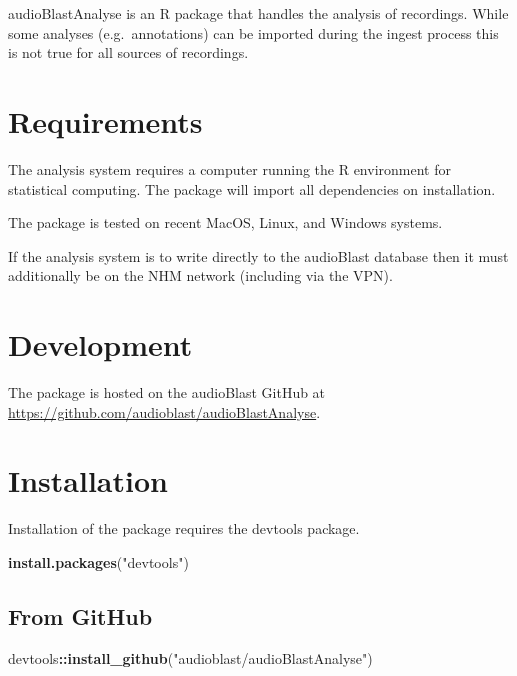 \documentclass[
]{book}
\newenvironment{Shaded}{\begin{snugshade}}{\end{snugshade}}
\newcommand{\FunctionTok}[1]{\textcolor[rgb]{0.13,0.29,0.53}{\textbf{#1}}}
\newcommand{\NormalTok}[1]{#1}
\newcommand{\SpecialCharTok}[1]{\textcolor[rgb]{0.81,0.36,0.00}{\textbf{#1}}}
\newcommand{\StringTok}[1]{\textcolor[rgb]{0.31,0.60,0.02}{#1}}
\begin{document}
audioBlastAnalyse is an R package that handles the analysis of recordings. While some analyses (e.g.~annotations) can be imported during the ingest process this is not true for all sources of recordings.

\hypertarget{requirements}{%
\section{Requirements}\label{requirements}}

The analysis system requires a computer running the R environment for statistical computing. The package will import all dependencies on installation.

The package is tested on recent MacOS, Linux, and Windows systems.

If the analysis system is to write directly to the audioBlast database then it must additionally be on the NHM network (including via the VPN).

\hypertarget{development}{%
\section{Development}\label{development}}

The package is hosted on the audioBlast GitHub at \url{https://github.com/audioblast/audioBlastAnalyse}.

\hypertarget{installation}{%
\section{Installation}\label{installation}}

Installation of the package requires the devtools package.

\begin{Shaded}
\begin{Highlighting}[]
\FunctionTok{install.packages}\NormalTok{(}\StringTok{"devtools"}\NormalTok{)}
\end{Highlighting}
\end{Shaded}

\hypertarget{from-github}{%
\subsection{From GitHub}\label{from-github}}

\begin{Shaded}
\begin{Highlighting}[]
\NormalTok{devtools}\SpecialCharTok{::}\FunctionTok{install\_github}\NormalTok{(}\StringTok{"audioblast/audioBlastAnalyse"}\NormalTok{)}
\end{Highlighting}
\end{Shaded}
\end{document}
